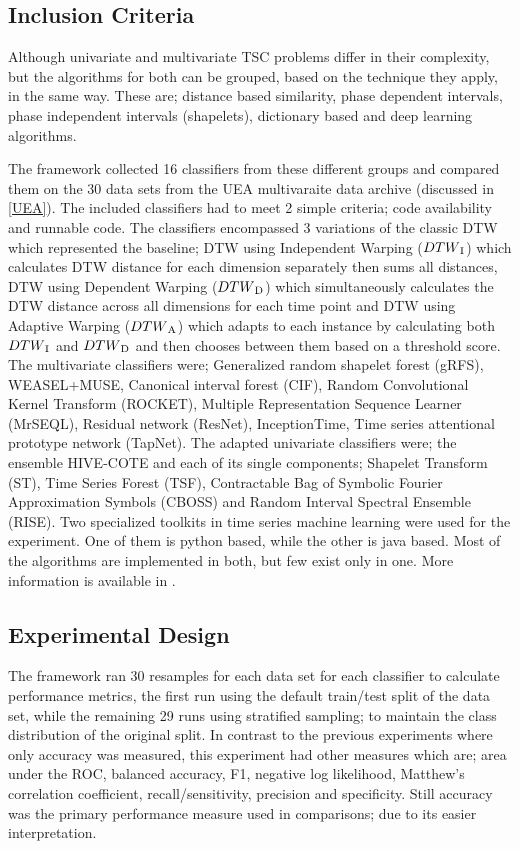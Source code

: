 \subsection{Inclusion Criteria}
\label{subsectionMultiBakeoffInclusion}
Although univariate and multivariate TSC problems differ in their complexity, but the algorithms for both can be grouped, based on the technique they apply, in the same way.
These are; distance based similarity, phase dependent intervals, phase independent intervals (shapelets), dictionary based and deep learning algorithms.

The framework collected 16 classifiers from these different groups and compared them on the 30 data sets from the UEA multivaraite data archive (discussed in \ref{UEA}).
The included classifiers had to meet 2 simple criteria; code availability and runnable code.
The classifiers encompassed 3 variations of the classic DTW which represented the baseline; DTW using Independent Warping ($DTW\textsubscript{I}$) which calculates DTW distance for each dimension separately then
sums all distances, DTW using Dependent Warping ($DTW\textsubscript{D}$) which simultaneously calculates the DTW distance across all dimensions for each time point and DTW using Adaptive Warping
($DTW\textsubscript{A}$) which adapts to each instance by calculating both $DTW\textsubscript{I}$ and $DTW\textsubscript{D}$ and then chooses between them based on a threshold score.
The multivariate classifiers were; Generalized random shapelet forest (gRFS), WEASEL+MUSE, Canonical interval forest (CIF), Random Convolutional Kernel Transform (ROCKET),
Multiple Representation Sequence Learner (MrSEQL), Residual network (ResNet), InceptionTime, Time series attentional prototype network (TapNet).
The adapted univariate classifiers were; the ensemble HIVE-COTE and each of its single components; Shapelet Transform (ST), Time Series Forest (TSF), Contractable Bag of Symbolic Fourier Approximation Symbols (CBOSS)
and Random Interval Spectral Ensemble (RISE).
Two specialized toolkits in time series machine learning were used for the experiment. One of them is python based, while the other is java based.
Most of the algorithms are implemented in both, but few exist only in one. More information is available in \cite{ruiz2020great}.

\subsection{Experimental Design}
\label{subsectionMultiBakeoffExperiment}
The framework ran 30 resamples for each data set for each classifier to calculate performance metrics, the first run using the default train/test split of the data set, while the remaining 29 runs using
stratified sampling; to maintain the class distribution of the original split.
In contrast to the previous experiments where only accuracy was measured, this experiment had other measures which are; area under the ROC, balanced accuracy, F1, negative log likelihood,
Matthew’s correlation coefficient, recall/sensitivity, precision and specificity. Still accuracy was the primary performance measure used in comparisons; due to its easier interpretation.

